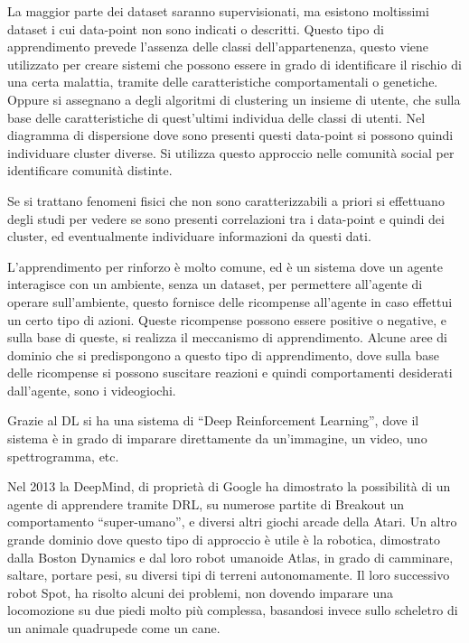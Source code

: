 \documentclass{article}
\numberwithin{equation}{subsection}
\begin{document}
La maggior parte dei dataset saranno supervisionati, ma esistono moltissimi dataset i cui data-point non sono 
indicati o descritti. Questo tipo di apprendimento prevede l'assenza delle classi dell'appartenenza, questo 
viene utilizzato per creare sistemi che possono essere in grado di identificare il rischio di una certa 
malattia, tramite delle caratteristiche comportamentali o genetiche. Oppure si assegnano a degli algoritmi 
di clustering un insieme di utente, che sulla base delle caratteristiche di quest'ultimi individua 
delle classi di utenti. Nel diagramma di dispersione dove sono presenti questi data-point si possono quindi 
individuare cluster diverse. Si utilizza questo approccio nelle comunità social per identificare 
comunità distinte. 

Se si trattano fenomeni fisici che non sono caratterizzabili a priori si effettuano degli studi per vedere se 
sono presenti correlazioni tra i data-point e quindi dei cluster, ed eventualmente individuare informazioni 
da questi dati. 

L'apprendimento per rinforzo è molto comune, ed è un sistema dove un agente interagisce con un ambiente, senza 
un dataset, per permettere all'agente di operare sull'ambiente, questo fornisce delle ricompense all'agente in caso 
effettui un certo tipo di azioni. Queste ricompense possono essere positive o negative, e sulla base di queste, 
si realizza il meccanismo di apprendimento. 
Alcune aree di dominio che si predispongono a questo tipo di apprendimento, dove sulla base delle ricompense 
si possono suscitare reazioni e quindi comportamenti desiderati dall'agente, sono i videogiochi. 

Grazie al DL si ha una sistema di ``Deep Reinforcement Learning'', dove il sistema è in grado di imparare 
direttamente da un'immagine, un video, uno spettrogramma, etc. 

Nel 2013 la DeepMind, di proprietà di Google ha dimostrato la possibilità di un agente di apprendere 
tramite DRL, su numerose partite di Breakout un comportamento ``super-umano'', e diversi altri giochi arcade 
della Atari. 
Un altro grande dominio dove questo tipo di approccio è utile è la robotica, dimostrato dalla Boston Dynamics 
e dal loro robot umanoide Atlas, in grado di camminare, saltare, portare pesi, su diversi tipi di terreni 
autonomamente. Il loro successivo robot Spot, ha risolto alcuni dei problemi, non dovendo imparare 
una locomozione su due piedi molto più complessa, basandosi invece sullo scheletro di un animale quadrupede 
come un cane. 
\end{document}
